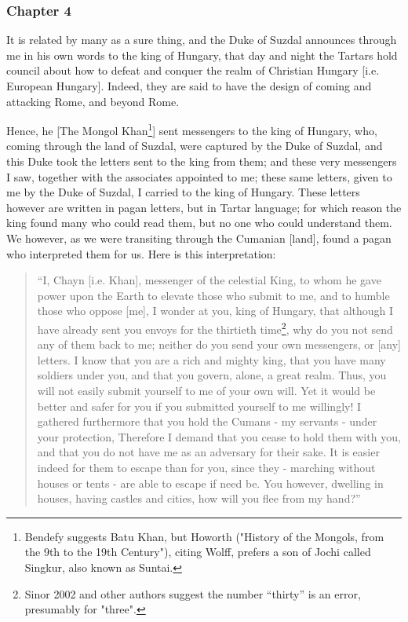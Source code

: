 \subsubsection{Chapter 4}

It is related by many as a sure thing, and the Duke of Suzdal announces through me in his own words to the king of Hungary, that day and night the Tartars hold council about how to defeat and conquer the realm of Christian Hungary [i.e. European Hungary]. Indeed, they are said to have the design of coming and attacking Rome, and beyond Rome.

Hence, he [The Mongol Khan\footnote{Bendefy suggests Batu Khan, but Howorth ("History of the Mongols, from the 9th to the 19th Century"), citing Wolff, prefers a son of Jochi called Singkur, also known as Suntai.}] sent messengers to the king of Hungary, who, coming through the land of Suzdal, were captured by the Duke of Suzdal, and this Duke took the letters sent to the king from them; and these very messengers I saw, together with the associates appointed to me; these same letters, given to me by the Duke of Suzdal, I carried to the king of Hungary. These letters however are written in pagan letters, but in Tartar language; for which reason the king found many who could read them, but no one who could understand them. We however, as we were transiting through the Cumanian [land], found a pagan who interpreted them for us. Here is this interpretation: 

\begin{quote}
``I, Chayn [i.e. Khan], messenger of the celestial King, to whom he gave power upon the Earth to elevate those who submit to me, and to humble those who oppose [me], I wonder at you, king of Hungary, that although I have already sent you envoys for the thirtieth time\footnote{Sinor 2002 and other authors suggest the number ``thirty'' is an error, presumably for "three".}, why do you not send any of them back to me; neither do you send your own messengers, or [any] letters. I know that you are a rich and mighty king, that you have many soldiers under you, and that you govern, alone, a great realm. Thus, you will not easily submit yourself to me of your own will. Yet it would be better and safer for you if you submitted yourself to me willingly! I gathered furthermore that you hold the Cumans - my servants - under your protection, Therefore I demand that you cease to hold them with you, and that you do not have me as an adversary for their sake. It is easier indeed for them to escape than for you, since they - marching without houses or tents - are able to escape if need be. You however, dwelling in houses, having castles and cities, how will you flee from my hand?''
\end{quote}


